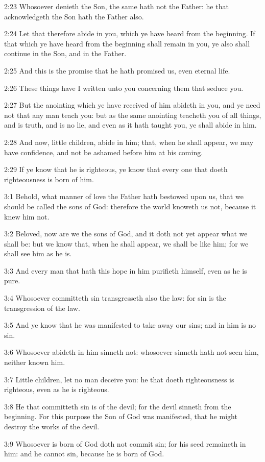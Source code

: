 2:23 Whosoever denieth the Son, the same hath not the Father: he that acknowledgeth the Son hath the Father also.

2:24 Let that therefore abide in you, which ye have heard from the beginning. If that which ye have heard from the beginning shall remain in you, ye also shall continue in the Son, and in the Father.

2:25 And this is the promise that he hath promised us, even eternal life.

2:26 These things have I written unto you concerning them that seduce you.

2:27 But the anointing which ye have received of him abideth in you, and ye need not that any man teach you: but as the same anointing teacheth you of all things, and is truth, and is no lie, and even as it hath taught you, ye shall abide in him.

2:28 And now, little children, abide in him; that, when he shall appear, we may have confidence, and not be ashamed before him at his coming.

2:29 If ye know that he is righteous, ye know that every one that doeth righteousness is born of him.

3:1 Behold, what manner of love the Father hath bestowed upon us, that we should be called the sons of God: therefore the world knoweth us not, because it knew him not.

3:2 Beloved, now are we the sons of God, and it doth not yet appear what we shall be: but we know that, when he shall appear, we shall be like him; for we shall see him as he is.

3:3 And every man that hath this hope in him purifieth himself, even as he is pure.

3:4 Whosoever committeth sin transgresseth also the law: for sin is the transgression of the law.

3:5 And ye know that he was manifested to take away our sins; and in him is no sin.

3:6 Whosoever abideth in him sinneth not: whosoever sinneth hath not seen him, neither known him.

3:7 Little children, let no man deceive you: he that doeth righteousness is righteous, even as he is righteous.

3:8 He that committeth sin is of the devil; for the devil sinneth from the beginning. For this purpose the Son of God was manifested, that he might destroy the works of the devil.

3:9 Whosoever is born of God doth not commit sin; for his seed remaineth in him: and he cannot sin, because he is born of God.

